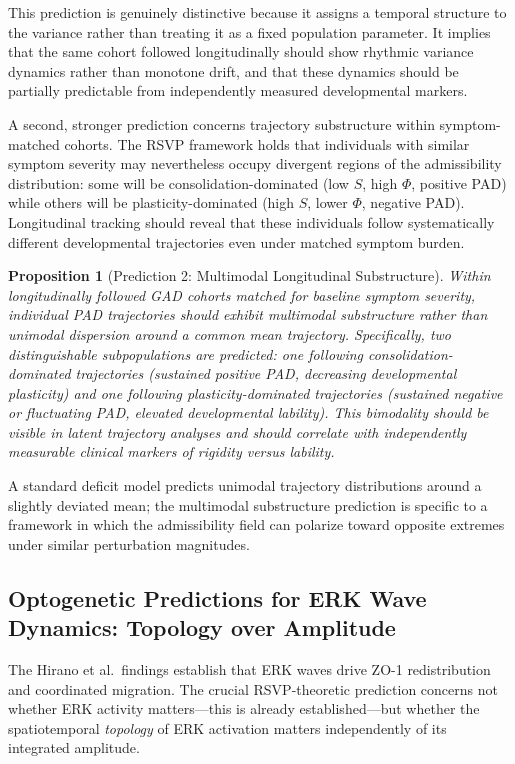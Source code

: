 \documentclass[11pt,a4paper]{article}
\theoremstyle{plain}
\newtheorem{proposition}[theorem]{Proposition}
\theoremstyle{definition}
\begin{document}
This prediction is genuinely distinctive because it assigns a temporal structure to
the variance rather than treating it as a fixed population parameter. It implies that
the same cohort followed longitudinally should show rhythmic variance dynamics rather
than monotone drift, and that these dynamics should be partially predictable from
independently measured developmental markers.

A second, stronger prediction concerns trajectory substructure within symptom-matched
cohorts. The RSVP framework holds that individuals with similar symptom severity may
nevertheless occupy divergent regions of the admissibility distribution: some will be
consolidation-dominated (low $S$, high $\Phi$, positive PAD) while others will be
plasticity-dominated (high $S$, lower $\Phi$, negative PAD). Longitudinal tracking
should reveal that these individuals follow systematically different developmental
trajectories even under matched symptom burden.

\begin{proposition}[Prediction 2: Multimodal Longitudinal Substructure]
Within longitudinally followed GAD cohorts matched for baseline symptom severity,
individual PAD trajectories should exhibit multimodal substructure rather than unimodal
dispersion around a common mean trajectory. Specifically, two distinguishable subpopulations
are predicted: one following consolidation-dominated trajectories (sustained positive
PAD, decreasing developmental plasticity) and one following plasticity-dominated
trajectories (sustained negative or fluctuating PAD, elevated developmental lability).
This bimodality should be visible in latent trajectory analyses and should correlate
with independently measurable clinical markers of rigidity versus lability.
\end{proposition}

A standard deficit model predicts unimodal trajectory distributions around a slightly
deviated mean; the multimodal substructure prediction is specific to a framework in which
the admissibility field can polarize toward opposite extremes under similar perturbation
magnitudes.

\subsection{Optogenetic Predictions for ERK Wave Dynamics: Topology over Amplitude}

The Hirano et al.\ findings establish that ERK waves drive ZO-1 redistribution and
coordinated migration. The crucial RSVP-theoretic prediction concerns not whether ERK
activity matters---this is already established---but whether the spatiotemporal
\emph{topology} of ERK activation matters independently of its integrated amplitude.
\end{document}

